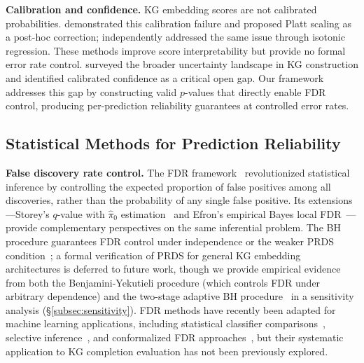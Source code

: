 \textbf{Calibration and confidence.}
KG embedding scores are not calibrated probabilities.
\cite{tabacof2020probability} demonstrated this calibration failure and proposed Platt scaling as a post-hoc correction; \cite{akrami2020calibrating} independently addressed the same issue through isotonic regression.
These methods improve score interpretability but provide no formal error rate control.
\cite{jarnac2025uncertainty} surveyed the broader uncertainty landscape in KG construction and identified calibrated confidence as a critical open gap.
Our framework addresses this gap by constructing valid $p$-values that directly enable FDR control, producing per-prediction reliability guarantees at controlled error rates.

\subsection{Statistical Methods for Prediction Reliability}

\textbf{False discovery rate control.}
The FDR framework~\cite{benjamini1995controlling} revolutionized statistical inference by controlling the expected proportion of false positives among all discoveries, rather than the probability of any single false positive.
Its extensions---Storey's $q$-value with $\hat{\pi}_0$ estimation~\cite{storey2002direct,storey2003statistical} and Efron's empirical Bayes local FDR~\cite{efron2004large,efron2007size}---provide complementary perspectives on the same inferential problem.
The BH procedure guarantees FDR control under independence or the weaker PRDS condition~\cite{benjamini2001control}; a formal verification of PRDS for general KG embedding architectures is deferred to future work, though we provide empirical evidence from both the Benjamini-Yekutieli procedure (which controls FDR under arbitrary dependence) and the two-stage adaptive BH procedure~\cite{benjamini2006adaptive} in a sensitivity analysis (\S\ref{subsec:sensitivity}).
FDR methods have recently been adapted for machine learning applications, including statistical classifier comparisons~\cite{demsar2006statistical}, selective inference~\cite{taylor2015statistical,lee2016exact}, and conformalized FDR approaches~\cite{angelopoulos2023conformal,angelopoulos2024prediction,bates2024cross}, but their systematic application to KG completion evaluation has not been previously explored.

